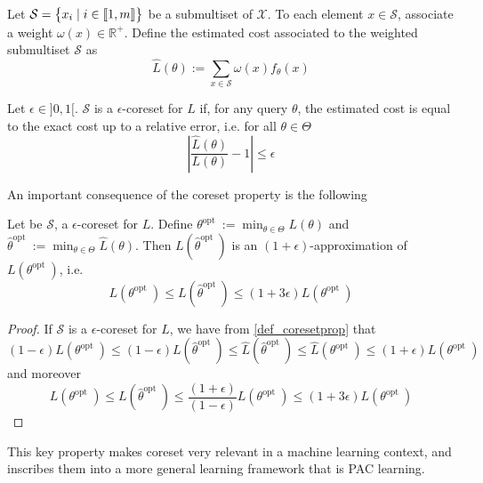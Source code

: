 Let $\mathcal{S}=\begin{Bmatrix}
x_{i} \mid i\in \llbracket 1,m \rrbracket
\end{Bmatrix}$ be a submultiset of $\mathcal{X}$. To each element $x \in \mathcal{S}$, associate a weight $\omega\left(x\right) \in \mathbb{R}^{+}$. Define the estimated cost associated to the weighted submultiset $\mathcal{S}$ as
$$
\hat{L}(\theta):=\sum_{x \in \mathcal{S}} \omega\left(x\right) f_\theta(x)
$$
\begin{definition}[Coreset]
    Let $\epsilon \in {]}0,1{[}$. $\mathcal{S}$ is a $\epsilon$-coreset for $L$ if, for any query $\theta$, the estimated cost is equal to the exact cost up to a relative error, i.e. for all $\theta \in \Theta$
    \begin{equation}
        \left|\frac{\hat{L}(\theta)}{L(\theta)}-1\right| \le \epsilon 
        \label{def_coresetprop}
    \end{equation}
\end{definition}
An important consequence of the coreset property is the following
\begin{theorem}
    Let be $\mathcal{S}$, a $\epsilon$-coreset for $L$. Define $\theta^{\text {opt }}:=\min_{\theta \in \Theta}L(\theta)$ and $\hat \theta^{\text {opt }}:=\min_{\theta \in \Theta}\hat L(\theta)$. Then $L( \hat \theta^{\text {opt }}) $ is an $(1+\epsilon)$-approximation of $L( \theta^{\text {opt }})$, i.e.
    \begin{equation*}
        L( {\theta}^{\text {opt }}) \le {L}( \hat{\theta}^{\text {opt }})\leq (1+ 3 \epsilon)L( \theta^{\text {opt }})
    \end{equation*}
    \label{thm_optcoreset}
\end{theorem}

\begin{proof}
    If $\mathcal{S}$ is a $\epsilon$-coreset for $L$, we have from \ref{def_coresetprop} that 
    \begin{equation}
        (1-\epsilon) L(\theta^{\text {opt }}) \le(1-\epsilon) L( \hat{\theta}^{\text {opt }}) \le \hat{L}( \hat{\theta}^{\text {opt }}) \le \hat{L}( \theta^{\text {opt }}) \le(1+\epsilon) L( \theta^{\text {opt }})
    \end{equation}
    and moreover
    \begin{equation}
        L( {\theta}^{\text {opt }}) \le {L}( \hat{\theta}^{\text {opt }}) \le \frac{(1+\epsilon)}{(1-\epsilon) } L( \theta^{\text {opt }}) \leq (1+ 3 \epsilon)L( \theta^{\text {opt }})
        \end{equation}
\end{proof}
This key property makes coreset very relevant in a machine learning context, and  inscribes them into a more general learning framework that is PAC learning.

